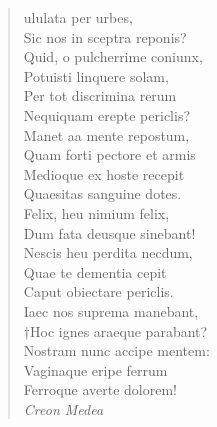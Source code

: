 \documentclass[11pt, a4paper]{report}
\begin{document}
\begin{verse}
ululata per urbes, \\ Sic nos in sceptra reponis? \\ Quid, o pulcherrime coniunx, \\ Potuisti linquere solam, \\ Per tot discrimina rerum \\ Nequiquam erepte periclis? \\ Manet aa mente repostum, \\ Quam forti pectore et armis \\  \lbrack Medioque ex hoste recepit \rbrack  \\ Quaesitas sanguine dotes. \\ Felix, heu nimium felix, \\ Dum fata deusque sinebant! \\ Nescis heu perdita necdum, \\ Quae te dementia cepit \\ Caput obiectare periclis. \\ Iaec nos suprema manebant, \\ †Hoc ignes araeque parabant? \\ Nostram nunc accipe mentem: \\ Vaginaque eripe ferrum \\ Ferroque averte dolorem! \\ \textit{
                    Creon
                    Medea
}
\end{verse}
\end{document}
